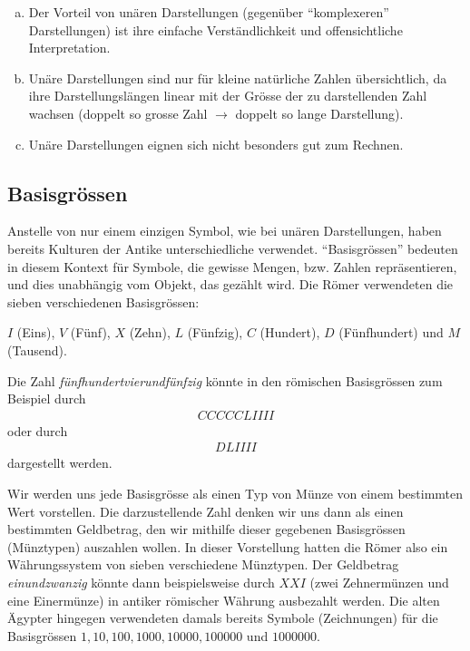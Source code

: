 \begin{myremark}\phantom{1}
	\begin{enumerate}[(a)]
		\item Der Vorteil von unären Darstellungen (gegenüber \enquote{komplexeren} Darstellungen) ist ihre einfache Verständlichkeit und
		      offensichtliche Interpretation.
		\item Unäre Darstellungen sind nur für kleine natürliche Zahlen übersichtlich, da ihre Darstellungslängen linear mit der Grösse der zu
		      darstellenden Zahl wachsen (doppelt so grosse Zahl $\rightarrow$ doppelt so lange Darstellung).
		\item Unäre Darstellungen eignen sich nicht besonders gut zum Rechnen.
	\end{enumerate}
\end{myremark}

\subsection{Basisgrössen}\label{subsection:Basisgroessen}
Anstelle von nur einem einzigen Symbol, wie bei unären Darstellungen, haben bereits Kulturen der Antike unterschiedliche
 verwendet. \enquote{Basisgrössen} bedeuten in diesem Kontext für Symbole, die gewisse Mengen, bzw. Zahlen repräsentieren, und dies unabhängig vom Objekt, das gezählt wird. Die Römer verwendeten die sieben verschiedenen Basisgrössen:
\begin{center}
	$I$ (Eins), $V$ (Fünf), $X$ (Zehn), $L$ (Fünfzig), $C$ (Hundert), $D$ (Fünfhundert) und $M$ (Tausend).
\end{center}
\begin{myexample}\label{myexample:roman}
Die Zahl \textit{fünfhundertvierundfünfzig} könnte in den römischen Basisgrössen zum Beispiel durch
\begin{align*}
	CCCCCLIIII
\end{align*}
oder durch
\begin{align*}
	DLIIII
\end{align*}
dargestellt werden.
\end{myexample}
Wir werden uns jede Basisgrösse als einen Typ von Münze von einem bestimmten Wert vorstellen. Die darzustellende Zahl
denken wir uns dann als einen bestimmten Geldbetrag, den wir mithilfe dieser gegebenen Basisgrössen (Münztypen) auszahlen wollen. In
dieser Vorstellung hatten die Römer also ein Währungssystem von sieben verschiedene Münztypen. Der Geldbetrag \textit{einundzwanzig} könnte
dann beispielsweise durch $XXI$ (zwei Zehnermünzen und eine Einermünze) in antiker römischer Währung ausbezahlt werden. Die alten Ägypter hingegen verwendeten damals bereits Symbole (Zeichnungen) für die Basisgrössen $1, 10, 100, 1000, 10000,
	100000$ und $1000000$.

